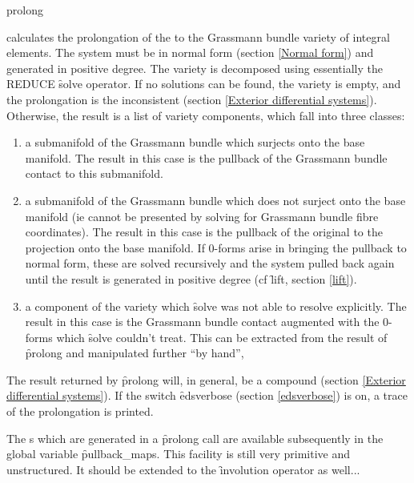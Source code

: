 \begin{edssyntax}
	prolong 
\end{edssyntax}
calculates the prolongation of the  to the Grassmann bundle
variety of integral elements. The system must be in normal form (section
\ref{Normal form}) and generated in positive degree. The variety is
decomposed using essentially the REDUCE \f{solve} operator. If no solutions
can be found, the variety is empty, and the prolongation is the
inconsistent  (section \ref{Exterior differential
systems}). Otherwise, the result is a list of variety components, which
fall into three classes:
\begin{enumerate}
\item a submanifold of the Grassmann bundle which surjects onto the base
      manifold. The result in this case is the pullback of the Grassmann
      bundle contact  to this submanifold.
\item a submanifold of the Grassmann bundle which does not surject onto the
      base manifold (ie cannot be presented by solving for Grassmann
      bundle fibre coordinates). The result in this case is the pullback of
      the original  to the projection onto the base manifold. If
      0-forms arise in bringing the pullback to normal form, these are
      solved recursively and the system pulled back again until the result
      is generated in positive degree (cf \f{lift}, section \ref{lift}).
\item a component of the variety which \f{solve} was not able to resolve
      explicitly. The result in this case is the Grassmann bundle contact
       augmented with the 0-forms which \f{solve} couldn't
      treat. This can be extracted from the result of \f{prolong} and
      manipulated further ``by hand'',
\end{enumerate}
The result returned by \f{prolong} will, in general, be a compound
 (section \ref{Exterior differential systems}). If the switch
\f{edsverbose} (section \ref{edsverbose}) is on, a trace of the
prolongation is printed.

The s which are generated in a \f{prolong} call are available
subsequently in the global variable \f{pullback\_maps}. This facility is
still very primitive and unstructured. It should be extended to the
\f{involution} operator as well...

